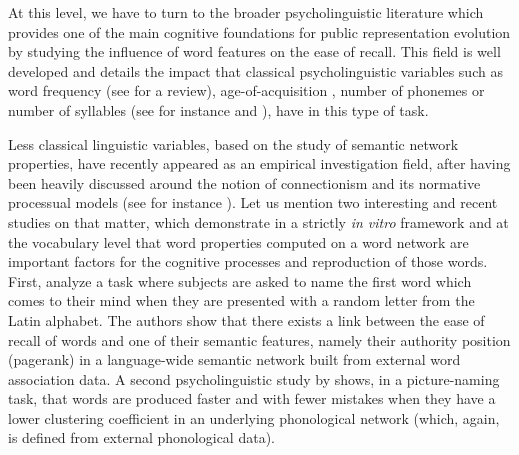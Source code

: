 At this level, we have to turn to the broader psycholinguistic literature which provides one of the main cognitive foundations for public representation evolution by studying the influence of word features on the ease of recall.
This field is well developed and details the impact that classical psycholinguistic variables such as word frequency (see \citet{Yonelinas02} for a review), age-of-acquisition \citep{Zevin02}, number of phonemes or number of syllables (see for instance \citet{Rey98} and \citet{nick-diss}), have in this type of task.

Less classical linguistic variables, based on the study of semantic network properties, have recently appeared as an empirical investigation field, after having been heavily discussed around the notion of connectionism and its normative processual models (see for instance \citet{collins1975spreading}).
Let us mention two interesting and recent studies on that matter, which demonstrate in a strictly \emph{in vitro} framework and at the vocabulary level that word properties computed on a word network are important factors for the cognitive processes and reproduction of those words.
First, \citet{Griffiths07} analyze a task where subjects are asked to name the first word which comes to their mind when they are presented with a random letter from the Latin alphabet.
The authors show that there exists a link between the ease of recall of words and one of their semantic features, namely their authority position (pagerank) in a language-wide semantic network built from external word association data.
A second psycholinguistic study by \citet{Chan10} shows, in a picture-naming task, that words are produced faster and with fewer mistakes when they have a lower clustering coefficient in an underlying phonological network (which, again, is  defined from external phonological data).



\smallskip
